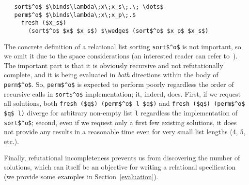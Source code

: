 \begin{lstlisting}
   sort$^o$ $\binds\lambda\;x\;x_s\;.\; \dots$
   perm$^o$ $\binds\lambda\;x\;x_p\;.$
     fresh ($x_s$) 
       (sort$^o$ $x$ $x_s$) $\wedge$ (sort$^o$ $x_p$ $x_s$) 
\end{lstlisting}

The concrete definition of a relational list sorting \lstinline|sort$^o$| is not important, so we
omit it due to the space considerations (an interested reader can refer to~\cite{OCanren}). The important part 
is that it is obviously recursive and not refutationally complete, and it is being evaluated 
in \emph{both} directions within the body of \lstinline|perm$^o$|. So, \lstinline|perm$^o$| is expected 
to perform poorly regardless the order of recursive calls in \lstinline|sort$^o$| implementation; it, 
indeed, does. First, if we request all solutions, both \lstinline|fresh ($q$) (perm$^o$ l $q$)| and \lstinline|fresh ($q$) (perm$^o$ $q$ l)| diverge for arbitrary non-empty list \lstinline|l| regardless the implementation of \lstinline|sort$^o$|; second, even if we request only a first few existing solutions, it does not provide any results in a reasonable time even for very small list lengths (4, 5, etc.).

Finally, refutational incompleteness prevents us from discovering the number of solutions, which can 
itself be an objective for writing a relational specification (we provide some examples in Section~\ref{evaluation}).


